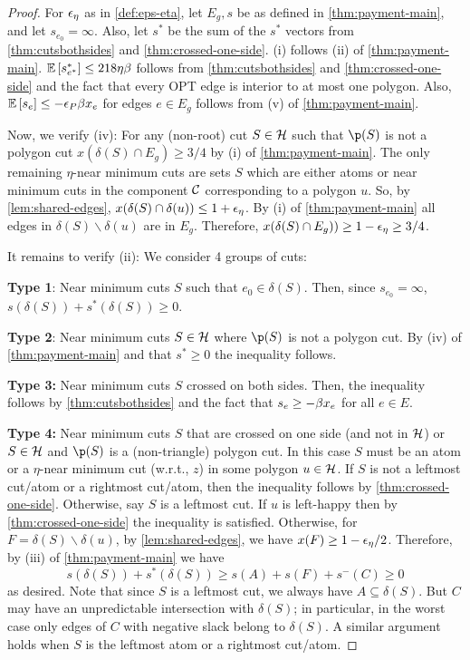 \beforetechnical*
\begin{proof}
For ${\epsilon}_\eta$ as in \cref{def:eps-eta}, let $E_g, s$ be as defined in \cref{thm:payment-main}, and let {$s_{e_0}=\infty$}.
Also, let $s^*$ be the sum of the $s^*$ vectors from \cref{thm:cutsbothsides} and \cref{thm:crossed-one-side}.
(i) follows (ii) of \cref{thm:payment-main}. 
${\mathbb{E}}\left[s^*_{e^*}\right]\leq 218\eta\beta$ follows from \cref{thm:cutsbothsides} and \cref{thm:crossed-one-side} and the fact that every OPT edge is interior to at most one polygon.
 Also, ${\mathbb{E}}\left[s_e\right]\leq -{\epsilon}_P \beta x_e$ for edges $e\in E_g$ follows from (v) of \cref{thm:payment-main}.
 
 Now, we verify (iv): For any (non-root) cut $S\in \mathcal{H}$ such that $\p(S)$ is not a polygon cut $x(\delta(S)\cap E_g)\geq 3/4$ by (i) of \cref{thm:payment-main}. The only remaining $\eta$-near minimum cuts are sets $S$ which are either atoms or near minimum cuts in the component ${\cal C}$ corresponding to a polygon $u$. So, by \cref{lem:shared-edges}, $x(\delta(S)\cap \delta(u))\leq 1+{\epsilon}_\eta$. By (i) of \cref{thm:payment-main} all edges in $\delta(S)\smallsetminus \delta(u)$ are in $E_g$. Therefore, $x(\delta(S)\cap E_g))\geq 1-{\epsilon}_\eta\geq 3/4$.
 
 It remains to verify (ii): We consider 4 groups of cuts:
 
{\bf Type 1}: Near minimum cuts $S$ such that $e_0\in \delta(S)$. Then, since $s_{e_0}=\infty$, $s(\delta(S))+s^*(\delta(S))\geq 0$.
 
 {\bf Type 2}: Near minimum cuts $S\in {\mathcal{H}}$ where $\p(S)$ is not a polygon cut. By (iv) of \cref{thm:payment-main} and that $s^*\geq 0$ the inequality follows.
  
 {\bf Type 3:} Near minimum cuts $S$ crossed on both sides. Then, the inequality follows by \cref{thm:cutsbothsides} and the fact that $s_e\geq -\beta x_e$ for all $e\in E$.
 
  {\bf Type 4:} Near minimum cuts $S$  that  are crossed on one side (and not in $\mathcal{H}$) or  $S\in \mathcal{H}$ and $\p(S)$ is a (non-triangle) polygon cut.
In this case $S$ must be an atom or a $\eta$-near minimum cut (w.r.t., $z$) in some polygon $u \in \mathcal{H}$. If $S$ is not a leftmost cut/atom or a rightmost cut/atom, then the inequality follows by \cref{thm:crossed-one-side}. Otherwise, say $S$ is a leftmost cut. If $u$ is left-happy then by \cref{thm:crossed-one-side} the inequality is satisfied. Otherwise, for $F=\delta(S)\smallsetminus \delta(u)$, by \cref{lem:shared-edges}, we have $x(F)\geq 1-{\epsilon}_\eta/2$. Therefore, by (iii) of \cref{thm:payment-main} we have
$$ s(\delta(S))+s^*(\delta(S))\geq  s(A)+s(F)+s^-(C) \geq 0$$
as desired. 
Note that since $S$ is a leftmost cut, we always have $A\subseteq \delta(S)$. But $C$ may have an unpredictable intersection with $\delta(S)$; in particular, in the worst case only edges of $C$ with negative slack belong to $\delta(S)$. 
A similar argument holds when $S$ is the leftmost atom or a rightmost cut/atom.


\end{proof}

